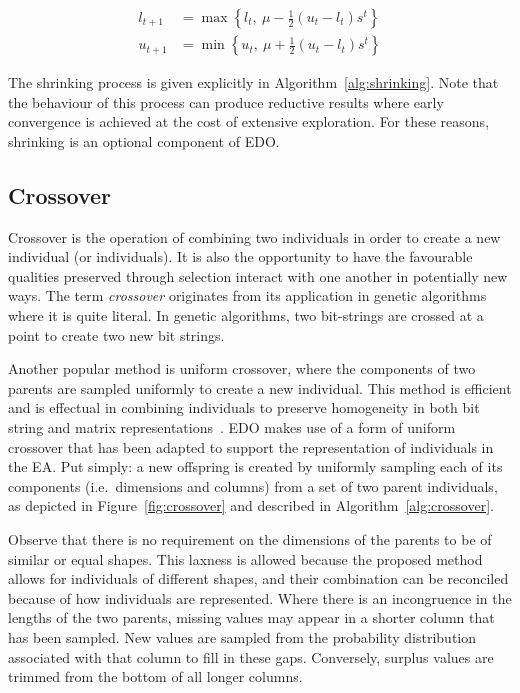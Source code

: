 \begin{align}
    \label{eq:shrinking_lower}
    l_{t+1}&= \max \left\{l_t, \ \mu - \frac{1}{2} (u_t - l_t) s^t\right\}\\
    \label{eq:shrinking_upper}
    u_{t+1}&= \min \left\{u_t, \ \mu + \frac{1}{2} (u_t - l_t) s^t\right\}
\end{align}

The shrinking process is given explicitly in Algorithm~\ref{alg:shrinking}. Note
that the behaviour of this process can produce reductive results where early
convergence is achieved at the cost of extensive exploration. For these reasons,
shrinking is an optional component of EDO.



\subsection{Crossover}

Crossover is the operation of combining two individuals in order to create a new
individual (or individuals). It is also the opportunity to have the favourable
qualities preserved through selection interact with one another in potentially
new ways. The term \emph{crossover} originates from its application in genetic
algorithms where it is quite literal. In genetic algorithms, two bit-strings are
crossed at a point to create two new bit strings.

Another popular method is uniform crossover, where the components of two parents
are sampled uniformly to create a new individual. This method is efficient and
is effectual in combining individuals to preserve homogeneity in both bit string
and matrix representations~\cite{Chen2018synthetic,Semenkin2012}. EDO makes use
of a form of uniform crossover that has been adapted to support the
representation of individuals in the EA. Put simply: a new offspring is created
by uniformly sampling each of its components (i.e.\ dimensions and columns) from
a set of two parent individuals, as depicted in Figure~\ref{fig:crossover} and
described in Algorithm~\ref{alg:crossover}.


Observe that there is no requirement on the dimensions of the parents to be of
similar or equal shapes. This laxness is allowed because the proposed method
allows for individuals of different shapes, and their combination can be
reconciled because of how individuals are represented. Where there is an
incongruence in the lengths of the two parents, missing values may appear in a
shorter column that has been sampled. New values are sampled from the
probability distribution associated with that column to fill in these gaps.
Conversely, surplus values are trimmed from the bottom of all longer columns.

